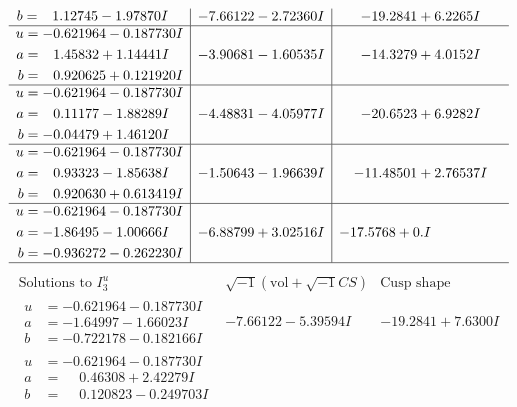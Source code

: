 \documentclass[1p]{elsarticle_modified}
\theoremstyle{definition}
\newcommand{\I}{\sqrt{-1}}
\begin{document}
$$\begin{array}{c|c|c}
\begin{aligned}
b &= \phantom{-}1.12745 - 1.97870 I\end{aligned}
 & -7.66122 - 2.72360 I & -19.2841 + 6.2265 I \\ \hline\begin{aligned}
u &= -0.621964 - 0.187730 I \\
a &= \phantom{-}1.45832 + 1.14441 I \\
b &= \phantom{-}0.920625 + 0.121920 I\end{aligned}
 & -3.90681 - 1.60535 I & -14.3279 + 4.0152 I \\ \hline\begin{aligned}
u &= -0.621964 - 0.187730 I \\
a &= \phantom{-}0.11177 - 1.88289 I \\
b &= -0.04479 + 1.46120 I\end{aligned}
 & -4.48831 - 4.05977 I & -20.6523 + 6.9282 I \\ \hline\begin{aligned}
u &= -0.621964 - 0.187730 I \\
a &= \phantom{-}0.93323 - 1.85638 I \\
b &= \phantom{-}0.920630 + 0.613419 I\end{aligned}
 & -1.50643 - 1.96639 I & -11.48501 + 2.76537 I \\ \hline\begin{aligned}
u &= -0.621964 - 0.187730 I \\
a &= -1.86495 - 1.00666 I \\
b &= -0.936272 - 0.262230 I\end{aligned}
 & -6.88799 + 3.02516 I & -17.5768 + 0. I\phantom{ +0.000000I}\\
 \hline 
 \end{array}$$\newpage$$\begin{array}{c|c|c}  
\text{Solutions to }I^u_{3}& \I (\text{vol} + \sqrt{-1}CS) & \text{Cusp shape}\\
 \hline 
\begin{aligned}
u &= -0.621964 - 0.187730 I \\
a &= -1.64997 - 1.66023 I \\
b &= -0.722178 - 0.182166 I\end{aligned}
 & -7.66122 - 5.39594 I & -19.2841 + 7.6300 I \\ \hline\begin{aligned}
u &= -0.621964 - 0.187730 I \\
a &= \phantom{-}0.46308 + 2.42279 I \\
b &= \phantom{-}0.120823 - 0.249703 I\end{aligned}

\end{array}$$
\end{document}
